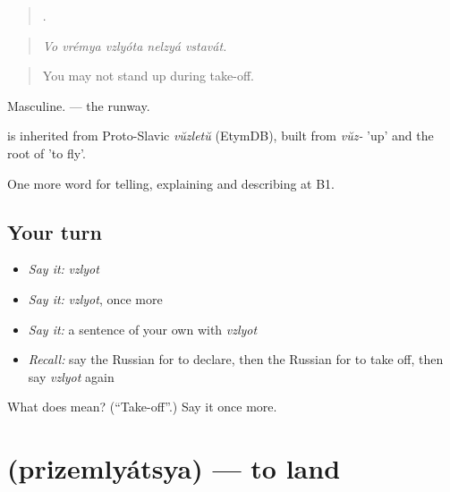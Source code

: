 \begin{quote}
    .
\end{quote}

\begin{quote}
\emph{Vo vrémya vzlyóta nelzyá vstavát.}
\end{quote}

\begin{quote}
You may not stand up during take-off.
\end{quote}

Masculine. \emph{ } — the runway.

\begin{cousinweb}
\emph{} is inherited from Proto-Slavic \emph{vŭzletŭ} (EtymDB), built from \emph{vŭz-} 'up' and the root of \emph{} 'to fly'.
\end{cousinweb}

\begin{grammarlens}[title={What you've built}]
One more word for telling, explaining and describing at B1.
\end{grammarlens}

\subsection*{Your turn}
\begin{itemize}
\raggedright
  \item \emph{Say it:} \emph{vzlyot}
  \item \emph{Say it:} \emph{vzlyot}, once more
  \item \emph{Say it:} a sentence of your own with \emph{vzlyot}
  \item \emph{Recall:} say the Russian for to declare, then the Russian for to take off, then say \emph{vzlyot} again
\end{itemize}

\begin{tcolorbox}[breakable,colback=teal!4,colframe=teal!35!black,title={Before you move on}]
What does  mean? (\textquotedblleft{}Take-off\textquotedblright{}.) Say it once more.
\end{tcolorbox}
\section[\texorpdfstring{\ru{приземляться} (prizemlyátsya)}{приземляться (prizemlyátsya)}]{ (prizemlyátsya) — to land}

